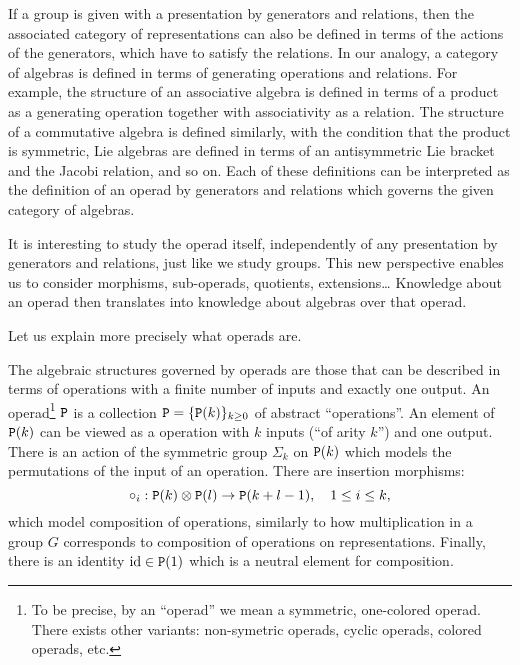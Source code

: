 If a group is given with a presentation by generators and relations, then the associated category of representations can also be defined in terms of the actions of the generators, which have to satisfy the relations.
In our analogy, a category of algebras is defined in terms of generating operations and relations.
For example, the structure of an associative algebra is defined in terms of a product as a generating operation together with associativity as a relation.
The structure of a commutative algebra is defined similarly, with the condition that the product is symmetric, Lie algebras are defined in terms of an antisymmetric Lie bracket and the Jacobi relation, and so on.
Each of these definitions can be interpreted as the definition of an operad by generators and relations which governs the given category of algebras.

It is interesting to study the operad itself, independently of any presentation by generators and relations, just like we study groups.
This new perspective enables us to consider morphisms, sub-operads, quotients, extensions\dots{}
Knowledge about an operad then translates into knowledge about algebras over that operad.

Let us explain more precisely what operads are.



The algebraic structures governed by operads are those that can be described in terms of operations with a finite number of inputs and exactly one output.
An operad\footnote{To be precise, by an ``operad'' we mean a symmetric, one-colored operad. There exists other variants: non-symetric operads, cyclic operads, colored operads, etc.} $\mathtt{P}$ is a collection $\mathtt{P} = \{ \mathtt{P}(k) \}_{k \ge 0}$ of abstract ``operations''.
An element of $\mathtt{P}(k)$ can be viewed as a operation with $k$ inputs (``of arity $k$'') and one output.
There is an action of the symmetric group $\Sigma_{k}$ on $\mathtt{P}(k)$ which models the permutations of the input of an operation.
There are insertion morphisms:
\[ \circ_{i} : \mathtt{P}(k) \otimes \mathtt{P}(l) \to \mathtt{P}(k+l-1), \quad 1 \leq i \leq k, \]
which model composition of operations, similarly to how multiplication in a group $G$ corresponds to composition of operations on representations.
Finally, there is an identity $\operatorname{id} \in \mathtt{P}(1)$ which is a neutral element for composition.

